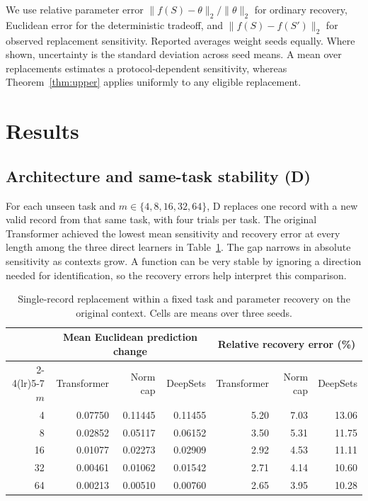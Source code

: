 \documentclass[11pt,letterpaper]{article}
\newcommand{\norm}[1]{\lVert #1\rVert_2}
\begin{document}
We use relative parameter error
\(\norm{f(S)-\theta}/\norm{\theta}\) for ordinary recovery, Euclidean
error for the deterministic tradeoff, and
\(\norm{f(S)-f(S')}\) for observed replacement sensitivity.
Reported averages weight seeds equally. Where shown, uncertainty is
the standard deviation across seed means. A mean over replacements
estimates a protocol-dependent sensitivity, whereas Theorem~\ref{thm:upper}
applies uniformly to any eligible replacement.

\section{Results}
\subsection{Architecture and same-task stability (D)}
For each unseen task and \(m\in\{4,8,16,32,64\}\), D replaces one
record with a new valid record from that same task, with four trials
per task. The original Transformer achieved the lowest mean
sensitivity and recovery error at every length among the three direct
learners in Table~\ref{tab:d}. The gap narrows in absolute sensitivity as
contexts grow. A function can be very stable by ignoring a direction
needed for identification, so the recovery errors help interpret this
comparison.

\begin{table}[ht]
\centering
\small
\begin{tabular}{r rrr rrr}
\toprule
&\multicolumn{3}{c}{Mean Euclidean prediction change}
&\multicolumn{3}{c}{Relative recovery error (\%)}\\
\cmidrule(lr){2-4}\cmidrule(lr){5-7}
\(m\)&Transformer&Norm cap&DeepSets&Transformer&Norm cap&DeepSets\\
\midrule
4  &0.07750&0.11445&0.11455&5.20&7.03&13.06\\
8  &0.02852&0.05117&0.06152&3.50&5.31&11.75\\
16 &0.01077&0.02273&0.02909&2.92&4.53&11.11\\
32 &0.00461&0.01062&0.01542&2.71&4.14&10.60\\
64 &0.00213&0.00510&0.00760&2.65&3.95&10.28\\
\bottomrule
\end{tabular}
\caption{Single-record replacement within a fixed task and parameter
recovery on the original context. Cells are means over three seeds.}
\label{tab:d}
\end{table}
\end{document}
